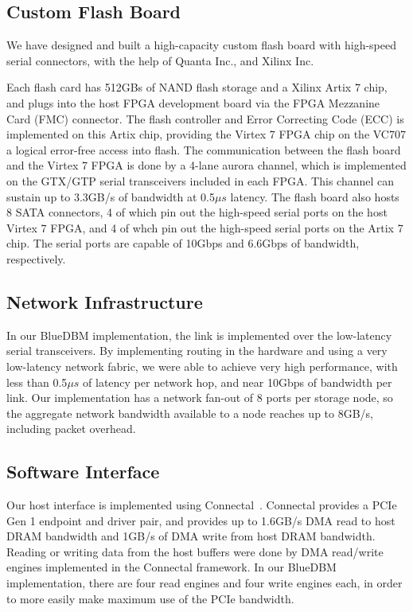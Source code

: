 \subsection{Custom Flash Board}


We have designed and built a high-capacity custom flash board with high-speed
serial connectors, with the help of Quanta Inc., and Xilinx Inc.

Each flash card has 512GBs of NAND flash storage and a Xilinx Artix 7 chip, and
plugs into the host FPGA development board via the FPGA Mezzanine Card (FMC)
connector. The flash controller and Error Correcting Code (ECC) is implemented
on this Artix chip, providing the Virtex 7 FPGA chip on the VC707 a logical
error-free access into flash. The communication between the flash board and the
Virtex 7 FPGA is done by a 4-lane aurora channel, which is implemented on the
GTX/GTP serial transceivers included in each FPGA. This channel can sustain up
to 3.3GB/s of bandwidth at 0.5$\mu s$ latency.
The flash board also hosts 8 SATA connectors, 4 of
which pin out the high-speed serial ports on the host Virtex 7 FPGA,
and 4 of whch pin out the high-speed serial ports on the Artix 7 chip.
The serial ports are capable of 10Gbps and 6.6Gbps of bandwidth, respectively.

\subsection{Network Infrastructure}

In our BlueDBM implementation, the link is implemented over the
low-latency serial transceivers.  By
implementing routing in the hardware and using a very low-latency network
fabric, we were able to achieve very high performance, with less than 0.5$\mu s$ of
latency per network hop, and near 10Gbps of bandwidth per link. Our
implementation has a network fan-out of 8 ports per storage node, so the
aggregate network bandwidth available to a node reaches up to 8GB/s, including
packet overhead.

\subsection{Software Interface}

Our host interface is implemented using Connectal~\cite{connectal}.
Connectal provides a PCIe Gen 1 endpoint and driver pair, and provides up to
1.6GB/s DMA read to host DRAM bandwidth and 1GB/s of DMA write from host DRAM
bandwidth. Reading or writing data from the host buffers were done by DMA read/write
engines implemented in the Connectal framework. In our BlueDBM
implementation, there are four read engines and four write engines each, in
order to more easily make maximum use of the PCIe bandwidth. 



